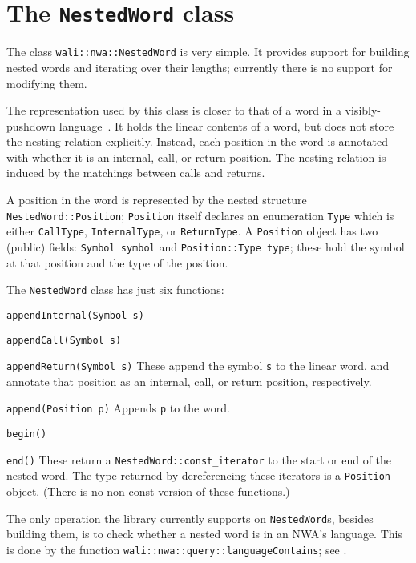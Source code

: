 \section{The \texttt{NestedWord} class}
\label{Se:class-nested-word}

The class \texttt{wali::nwa::NestedWord} is very simple. It provides support for
building nested words and iterating over their lengths; currently there
is no support for modifying them.

The representation used by this class is closer to that of a word in a
visibly-pushdown language~\cite{JACM:AM09}. It holds the linear contents of
a word, but does not store the nesting relation explicitly. Instead, each
position in the word is annotated with whether it is an internal, call, or
return position. The nesting relation is induced by the matchings between
calls and returns.

A position in the word is represented by the nested structure
\texttt{NestedWord::Position}; \texttt{Position} itself declares an
enumeration \texttt{Type} which is either \texttt{CallType},
\texttt{InternalType}, or \texttt{ReturnType}.
A \texttt{Position} object has two (public) fields: \texttt{Symbol symbol}
and \texttt{Position::Type type}; these hold the symbol at that position and
the type of the position.


The \texttt{NestedWord} class has just six functions:
\begin{description}
  \item\texttt{appendInternal(Symbol s)}
  \item\texttt{appendCall(Symbol s)}
  \item\texttt{appendReturn(Symbol s)}
    These append the symbol \texttt{s} to the linear word, and annotate that
    position as an internal, call, or return position, respectively.
  \item\texttt{append(Position p)}
    Appends \texttt{p} to the word.
  \item\texttt{begin()}
  \item\texttt{end()}
    These return a \texttt{NestedWord::const\_iterator} to the start or end
    of the nested word. The type returned by dereferencing these iterators is
    a \texttt{Position} object. (There is no non-const version of these
    functions.)
\end{description}

The only operation the library currently supports on
\texttt{NestedWord}s, besides building them, is to check whether a
nested word is in an NWA's language. This is done by the function
\texttt{wali::nwa::query::languageContains}; see
.

